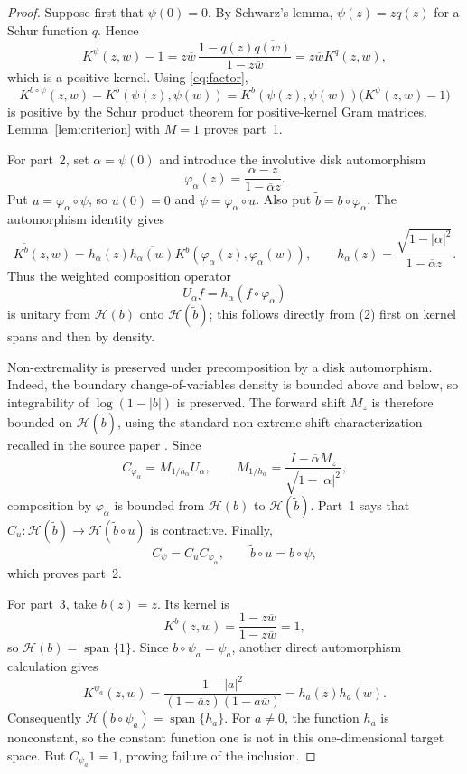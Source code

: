 \documentclass[11pt]{article}
\theoremstyle{remark}
\newcommand{\cH}{\mathcal H}
\begin{document}
\begin{proof}
Suppose first that \(\psi(0)=0\). By Schwarz's lemma,
\(\psi(z)=zq(z)\) for a Schur function \(q\). Hence
\[
  K^\psi(z,w)-1
  =z\overline w\,
    \frac{1-q(z)\overline{q(w)}}{1-z\overline w}
  =z\overline w K^q(z,w),
\]
which is a positive kernel. Using \eqref{eq:factor},
\[
  K^{b\circ\psi}(z,w)-K^b(\psi(z),\psi(w))
  =K^b(\psi(z),\psi(w))\bigl(K^\psi(z,w)-1\bigr)
\]
is positive by the Schur product theorem for positive-kernel Gram matrices.
Lemma~\ref{lem:criterion} with \(M=1\) proves part~1.

For part~2, set \(\alpha=\psi(0)\) and introduce the involutive disk
automorphism
\[
  \varphi_\alpha(z)=\frac{\alpha-z}{1-\overline\alpha z}.
\]
Put \(u=\varphi_\alpha\circ\psi\), so \(u(0)=0\) and
\(\psi=\varphi_\alpha\circ u\). Also put
\(\widetilde b=b\circ\varphi_\alpha\). The automorphism identity gives
\begin{equation}
  K^{\widetilde b}(z,w)
  =h_\alpha(z)\overline{h_\alpha(w)}
    K^b(\varphi_\alpha(z),\varphi_\alpha(w)),
  \qquad
  h_\alpha(z)=\frac{\sqrt{1-|\alpha|^2}}{1-\overline\alpha z}.
  \tag{2}
\end{equation}
Thus the weighted composition operator
\[
  U_\alpha f=h_\alpha(f\circ\varphi_\alpha)
\]
is unitary from \(\cH(b)\) onto \(\cH(\widetilde b)\); this follows directly
from (2) first on kernel spans and then by density.

Non-extremality is preserved under precomposition by a disk automorphism.
Indeed, the boundary change-of-variables density is bounded above and below,
so integrability of \(\log(1-|b|)\) is preserved. The forward shift \(M_z\)
is therefore bounded on \(\cH(\widetilde b)\), using the standard
non-extreme shift characterization recalled in the source paper
\cite[p.~1]{DS}. Since
\[
  C_{\varphi_\alpha}
  =M_{1/h_\alpha}U_\alpha,
  \qquad
  M_{1/h_\alpha}
  =\frac{I-\overline\alpha M_z}{\sqrt{1-|\alpha|^2}},
\]
composition by \(\varphi_\alpha\) is bounded from \(\cH(b)\) to
\(\cH(\widetilde b)\). Part~1 says that
\(C_u:\cH(\widetilde b)\to\cH(\widetilde b\circ u)\) is contractive.
Finally,
\[
  C_\psi=C_uC_{\varphi_\alpha},
  \qquad
  \widetilde b\circ u=b\circ\psi,
\]
which proves part~2.

For part~3, take \(b(z)=z\). Its kernel is
\[
  K^b(z,w)=\frac{1-z\overline w}{1-z\overline w}=1,
\]
so \(\cH(b)=\operatorname{span}\{1\}\). Since
\(b\circ\psi_a=\psi_a\), another direct automorphism calculation gives
\[
  K^{\psi_a}(z,w)
  =\frac{1-|a|^2}
  {(1-\overline a z)(1-a\overline w)}
  =h_a(z)\overline{h_a(w)}.
\]
Consequently \(\cH(b\circ\psi_a)=\operatorname{span}\{h_a\}\). For
\(a\ne0\), the function \(h_a\) is nonconstant, so the constant function
one is not in this one-dimensional target space. But
\(C_{\psi_a}1=1\), proving failure of the inclusion.
\end{proof}
\end{document}

